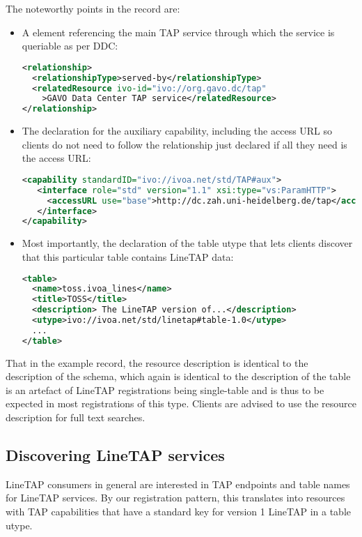 \documentclass[11pt,a4paper]{ivoa}
\begin{document}
The noteworthy points in the record are:

\begin{itemize}
\item A  element referencing the main TAP service
through which the service is queriable as per DDC:
\begin{lstlisting}[language=XML,basicstyle=\footnotesize]
<relationship>
  <relationshipType>served-by</relationshipType>
  <relatedResource ivo-id="ivo://org.gavo.dc/tap"
    >GAVO Data Center TAP service</relatedResource>
</relationship>
\end{lstlisting}

\item The declaration for the auxiliary capability, including the access
URL so clients do not need to follow the relationship just declared if
all they need is the access URL:
\begin{lstlisting}[language=XML,basicstyle=\footnotesize]
<capability standardID="ivo://ivoa.net/std/TAP#aux">
   <interface role="std" version="1.1" xsi:type="vs:ParamHTTP">
     <accessURL use="base">http://dc.zah.uni-heidelberg.de/tap</accessURL>
   </interface>
</capability>
\end{lstlisting}

\item Most importantly, the declaration of the table utype that lets
clients discover that this particular table contains LineTAP data:
\begin{lstlisting}[language=XML,basicstyle=\footnotesize]
<table>
  <name>toss.ivoa_lines</name>
  <title>TOSS</title>
  <description> The LineTAP version of...</description>
  <utype>ivo://ivoa.net/std/linetap#table-1.0</utype>
  ...
</table>
\end{lstlisting}
\end{itemize}

That in the example record, the resource description is identical to the
description of the schema, which again is identical to the description
of the table is an artefact of LineTAP registrations being single-table
and is thus to be expected in most registrations of this type.  Clients
are advised to use the resource description for full text searches.


\subsection{Discovering LineTAP services}

LineTAP consumers in general are interested in TAP endpoints and table names for
LineTAP services.  By our registration pattern, this translates into
resources with TAP capabilities that have a standard key for version 1
LineTAP in a table utype.
\end{document}
